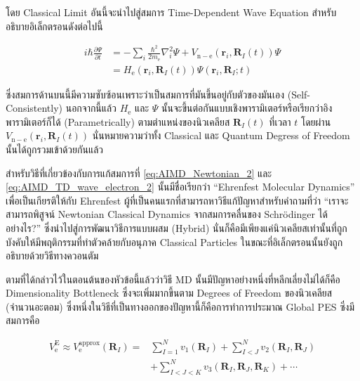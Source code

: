 โดย Classical Limit อันนี้จะนำไปสู่สมการ Time-Dependent Wave Equation สำหรับอธิบายอิเล็กตรอนดังต่อไปนี้

\begin{align}
  \label{eq:AIMD_TD_wave_electron_1}
  i \hbar \frac{\partial \Psi}{\partial t}
   & = -\sum_i \frac{\hbar^2}{2 m_{\mathrm{e}}} \nabla_i^2 \Psi
  + V_{\mathrm{n}-\mathrm{e}}\left(\mathbf{r}_i,\mathbf{R}_I(t)\right) \Psi \\
  \label{eq:AIMD_TD_wave_electron_2}
   & = H_{\mathrm{e}}\left(\mathbf{r}_i,\mathbf{R}_I(t)\right)
  \Psi\left(\mathbf{r}_i,\mathbf{R}_I ; t\right)
\end{align}

\noindent ซึ่งสมการด้านบนนี้มีความซับซ้อนเพราะว่าเป็นสมการที่มันขึ้นอยู่กับตัวของมันเอง (Self-Consistently) นอกจากนี้แล้ว
$H_{\mathrm{e}}$ และ $\Psi$ นั้นจะขึ้นต่อกันแบบเชิงพารามิเตอร์หรือเรียกว่าอิงพารามิเตอร์ก็ได้ (Parametrically) ตามตำแหน่งของนิวเคลียส
$\mathbf{R}_I(t)$ ที่เวลา $t$ โดยผ่าน $V_{\mathrm{n}-\mathrm{e}}\left(\mathbf{r}_i,\mathbf{R}_I(t)\right)$
นั่นหมายความว่าทั้ง Classical และ Quantum Degress of Freedom นั้นได้ถูกรวมเข้าด้วยกันแล้ว

สำหรับวิธีที่เกี่ยวข้องกับการแก้สมการที่ \eqref{eq:AIMD_Newtonian_2} และ \eqref{eq:AIMD_TD_wave_electron_2} นั้นมีชื่อเรียกว่า
\enquote{Ehrenfest Molecular Dynamics} เพื่อเป็นเกียรติให้กับ Ehrenfest ผู้ที่เป็นคนแรกที่สามารถหาวิธีแก้ปัญหาสำหรับคำถามที่ว่า
\enquote{เราจะสามารถพิสูจน์ Newtonian Classical Dynamics จากสมการคลื่นของ Schr\"{o}dinger ได้อย่างไร?}
ซึ่งนำไปสู่การพัฒนาวิธีการแบบผสม (Hybrid) นั่นก็คือมีเพียงแค่นิวเคลียสเท่านั้นที่ถูกบังคับให้มีพฤติกรรมที่ทำตัวคล้ายกับอนุภาค Classical
Particles ในขณะที่อิเล็กตรอนนั้นยังถูกอธิบายด้วยวิธีทางควอนตัม

ตามที่ได้กล่าวไว้ในตอนต้นของหัวข้อนี้แล้วว่าวิธี MD นั้นมีปัญหาอย่างหนึ่งที่หลีกเลี่ยงไม่ได้ก็คือ Dimensionality Bottleneck ซึ่งจะเพิ่มมากขึ้นตาม
Degrees of Freedom ของนิวเคลียส (จำนวนอะตอม) ซึ่งหนึ่งในวิธีที่เป็นทางออกของปัญหานี้ก็คือการทำการประมาณ Global PES ซึ่งมีสมการคือ

\begin{align}
  V_{\mathrm{e}}^{\mathrm{E}} \approx V_{\mathrm{e}}^{\mathrm{approx}}\left(\mathbf{R}_I\right)
  = &
  \sum_{I=1}^N v_1\left(\mathbf{R}_I\right)+\sum_{I<J}^N v_2\left(\mathbf{R}_I, \mathbf{R}_J\right) \nonumber \\
    & +\sum_{I<J<K}^N v_3\left(\mathbf{R}_I, \mathbf{R}_J, \mathbf{R}_K\right) + \cdots
\end{align}

